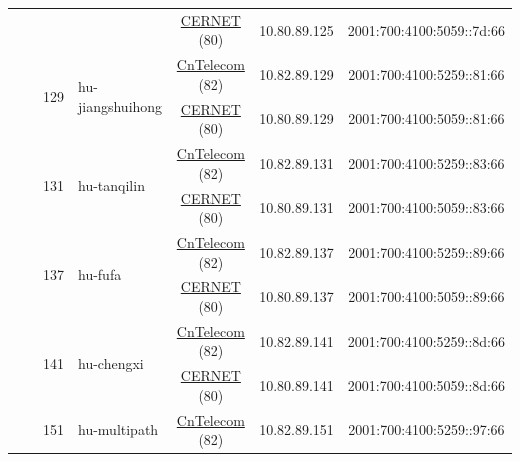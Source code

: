 \begin{small}
\begin{center}
\begin{longtable}{|c|c|c|c|c|c|c|c|}
  &  &  &  & \multicolumn{2}{|c|}{\tiny{\href{http://www.cernet.edu.cn}{CERNET} (80)}} & \tiny{10.80.89.125} & \tiny{2001:700:4100:5059::7d:66} \\* \cline{3-3}\cline{4-4}\cline{5-5}\cline{6-6}\cline{7-7}\cline{8-8}
  &  & \multirow{2}{*}{\tiny{129}} & \multicolumn{1}{|l|}{\multirow{2}{*}{\tiny{hu-jiangshuihong}}} & \multicolumn{2}{|c|}{\tiny{\href{http://www.chinatelecom.com.cn}{CnTelecom} (82)}} & \tiny{10.82.89.129} & \tiny{2001:700:4100:5259::81:66} \\* \cline{5-5}\cline{6-6}\cline{7-7}\cline{8-8}
  &  &  &  & \multicolumn{2}{|c|}{\tiny{\href{http://www.cernet.edu.cn}{CERNET} (80)}} & \tiny{10.80.89.129} & \tiny{2001:700:4100:5059::81:66} \\* \cline{3-3}\cline{4-4}\cline{5-5}\cline{6-6}\cline{7-7}\cline{8-8}
  &  & \multirow{2}{*}{\tiny{131}} & \multicolumn{1}{|l|}{\multirow{2}{*}{\tiny{hu-tanqilin}}} & \multicolumn{2}{|c|}{\tiny{\href{http://www.chinatelecom.com.cn}{CnTelecom} (82)}} & \tiny{10.82.89.131} & \tiny{2001:700:4100:5259::83:66} \\* \cline{5-5}\cline{6-6}\cline{7-7}\cline{8-8}
  &  &  &  & \multicolumn{2}{|c|}{\tiny{\href{http://www.cernet.edu.cn}{CERNET} (80)}} & \tiny{10.80.89.131} & \tiny{2001:700:4100:5059::83:66} \\* \cline{3-3}\cline{4-4}\cline{5-5}\cline{6-6}\cline{7-7}\cline{8-8}
  &  & \multirow{2}{*}{\tiny{137}} & \multicolumn{1}{|l|}{\multirow{2}{*}{\tiny{hu-fufa}}} & \multicolumn{2}{|c|}{\tiny{\href{http://www.chinatelecom.com.cn}{CnTelecom} (82)}} & \tiny{10.82.89.137} & \tiny{2001:700:4100:5259::89:66} \\* \cline{5-5}\cline{6-6}\cline{7-7}\cline{8-8}
  &  &  &  & \multicolumn{2}{|c|}{\tiny{\href{http://www.cernet.edu.cn}{CERNET} (80)}} & \tiny{10.80.89.137} & \tiny{2001:700:4100:5059::89:66} \\* \cline{3-3}\cline{4-4}\cline{5-5}\cline{6-6}\cline{7-7}\cline{8-8}
  &  & \multirow{2}{*}{\tiny{141}} & \multicolumn{1}{|l|}{\multirow{2}{*}{\tiny{hu-chengxi}}} & \multicolumn{2}{|c|}{\tiny{\href{http://www.chinatelecom.com.cn}{CnTelecom} (82)}} & \tiny{10.82.89.141} & \tiny{2001:700:4100:5259::8d:66} \\* \cline{5-5}\cline{6-6}\cline{7-7}\cline{8-8}
  &  &  &  & \multicolumn{2}{|c|}{\tiny{\href{http://www.cernet.edu.cn}{CERNET} (80)}} & \tiny{10.80.89.141} & \tiny{2001:700:4100:5059::8d:66} \\* \cline{3-3}\cline{4-4}\cline{5-5}\cline{6-6}\cline{7-7}\cline{8-8}
  &  & \multirow{2}{*}{\tiny{151}} & \multicolumn{1}{|l|}{\multirow{2}{*}{\tiny{hu-multipath}}} & \multicolumn{2}{|c|}{\tiny{\href{http://www.chinatelecom.com.cn}{CnTelecom} (82)}} & \tiny{10.82.89.151} & \tiny{2001:700:4100:5259::97:66} \\* \cline{5-5}\cline{6-6}\cline{7-7}\cline{8-8}

\end{longtable}
\end{center}
\end{small}
